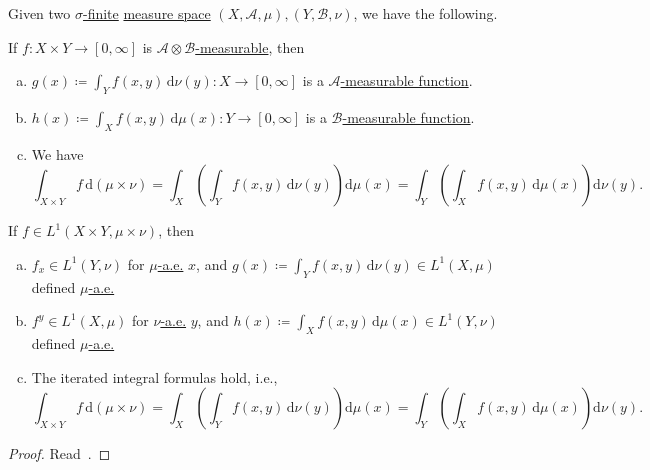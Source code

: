 \begin{theorem}\label{thm:Fubini-Tonelli}
	Given two \hyperref[def:finite-measure]{\(\sigma \)-finite} \hyperref[def:measure-space]{measure space} \((X, \mathcal{A} , \mu ), (Y, \mathcal{B} , \nu )\), we have the following.

	\begin{theorem*}\label{thm:Tonelli}
		If \(f\colon X\times Y\to [0, \infty ]\) is \hyperref[def:A-measurable-function]{\(\mathcal{A} \otimes \mathcal{B} \)-measurable}, then
		\begin{enumerate}[(a)]
			\item \(g(x) \coloneqq \int_Y f(x, y)\,\mathrm{d} \nu (y) \colon X\to [0, \infty ]\) is a \hyperref[def:A-measurable-function]{\(\mathcal{A}\)-measurable function}.
			\item \(h(x) \coloneqq \int_X f(x, y)\,\mathrm{d} \mu (x) \colon Y\to [0, \infty ]\) is a \hyperref[def:A-measurable-function]{\(\mathcal{B}\)-measurable function}.
			\item We have
			      \[
				      \int_{X\times Y} f \,\mathrm{d}(\mu \times \nu ) = \int _X\left(\int _Y f(x, y)\,\mathrm{d}\nu (y)\right)\mathrm{d} \mu (x) = \int _Y\left(\int_X f(x, y)\,\mathrm{d} \mu (x)\right)\mathrm{d} \nu (y).
			      \]
		\end{enumerate}
	\end{theorem*}

	\begin{theorem*}\label{thm:Fubini}
		If \(f\in L^1(X\times Y, \mu \times \nu )\), then
		\begin{enumerate}[(a)]
			\item \(f_{x} \in L^1(Y, \nu )\) for \hyperref[def:mu-almost-everywhere]{\(\mu\)-a.e.} \(x\), and \(g(x) \coloneqq \int_Y f(x, y)\,\mathrm{d} \nu (y) \in L^1(X, \mu )\) defined \hyperref[def:mu-almost-everywhere]{\(\mu\)-a.e.}
			\item \(f^{y} \in L^1(X, \mu )\) for \hyperref[def:mu-almost-everywhere]{\(\nu\)-a.e.} \(y\), and \(h(x) \coloneqq \int_X f(x, y)\,\mathrm{d} \mu (x) \in L^1(Y, \nu )\) defined \hyperref[def:mu-almost-everywhere]{\(\mu\)-a.e.}
			\item The iterated integral formulas hold, i.e.,
			      \[
				      \int_{X\times Y} f \,\mathrm{d}(\mu \times \nu ) = \int _X\left(\int _Y f(x, y)\,\mathrm{d}\nu (y)\right)\mathrm{d} \mu (x) = \int _Y\left(\int_X f(x, y)\,\mathrm{d} \mu (x)\right)\mathrm{d} \nu (y).
			      \]
		\end{enumerate}
	\end{theorem*}
\end{theorem}
\begin{proof}
	Read~\cite{folland1999real}.
\end{proof}

